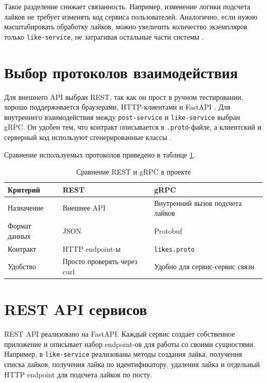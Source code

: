 Такое разделение снижает связанность. Например, изменение логики подсчета лайков не требует
изменять код сервиса пользователей. Аналогично, если нужно масштабировать обработку лайков, можно
увеличить количество экземпляров только \texttt{like-service}, не затрагивая остальные части
системы \cite{week17_arch}.

\section{Выбор протоколов взаимодействия}

Для внешнего API выбран REST, так как он прост в ручном тестировании, хорошо поддерживается
браузерами, HTTP-клиентами и FastAPI \cite{fastapi_docs}. Для внутреннего взаимодействия между
\texttt{post-service} и \texttt{like-service} выбран gRPC. Он удобен тем, что контракт описывается
в \texttt{.proto}-файле, а клиентский и серверный код используют сгенерированные классы
\cite{grpc_docs}.

Сравнение используемых протоколов приведено в таблице \ref{tab:rest-grpc}.

\begin{table}[h!]
    \caption{Сравнение REST и gRPC в проекте}
    \label{tab:rest-grpc}
    \noindent
    \begin{tabular*}{\textwidth}{|p{}|p{}|p{}|}
        \hline
        Критерий & REST & gRPC \\
        \hline
        Назначение & Внешнее API & Внутренний вызов подсчета лайков \\
        \hline
        Формат данных & JSON & Protobuf \\
        \hline
        Контракт & HTTP endpoint-ы & \texttt{likes.proto} \\
        \hline
        Удобство & Просто проверять через curl & Удобно для сервис-сервис связи \\
        \hline
    \end{tabular*}
\end{table}

\section{REST API сервисов}

REST API реализовано на FastAPI. Каждый сервис создает собственное приложение и описывает набор
endpoint-ов для работы со своими сущностями. Например, в \texttt{like-service} реализованы
методы создания лайка, получения списка лайков, получения лайка по идентификатору, удаления лайка
и отдельный HTTP endpoint для подсчета лайков по посту.

